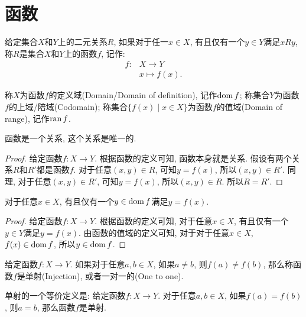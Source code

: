 \section{函数}
\begin{definition}[函数]
	给定集合$X$和$Y$上的二元关系$R$, 如果对于任一$x\in X$, 有且仅有一个$y\in Y$满足$xRy$, 称$R$是集合$X$和$Y$上的函数$f$, 记作:
	\begin{align*}
		f\colon & X\rightarrow Y \\
		& x\mapsto f(x).
	\end{align*}
	
	称$X$为函数$f$的定义域(Domain/Domain of definition), 记作$\operatorname{dom} f$; 称集合$Y$为函数$f$的上域/陪域(Codomain); 称集合$\{f(x)\mid x\in X\}$为函数$f$的值域(Domain of range), 记作$\operatorname{ran} f$.
\end{definition}

\begin{proposition}
	函数是一个关系, 这个关系是唯一的.
\end{proposition}

\begin{proof}
	给定函数$f\colon X\rightarrow Y$. 根据函数的定义可知, 函数本身就是关系. 假设有两个关系$R$和$R'$都是函数$f$. 对于任意$(x,y)\in R$, 可知$y=f(x)$, 所以$(x,y)\in R'$. 同理, 对于任意$(x,y)\in R'$, 可知$y=f(x)$, 所以$(x,y)\in R$. 所以$R=R'$.
\end{proof}

\begin{corollary}
	对于任意$x\in X$, 有且仅有一个$y\in \operatorname{dom} f$满足$y=f(x)$.
\end{corollary}

\begin{proof}
	给定函数$f\colon X\rightarrow Y$. 根据函数的定义可知, 对于任意$x\in X$, 有且仅有一个$y\in Y$满足$y=f(x)$. 由函数的值域的定义可知, 对于对于任意$x\in X$, $f(x)\in \operatorname{dom} f$, 所以$y\in \operatorname{dom} f$.
\end{proof}

\begin{definition}[单射]
	给定函数$f\colon X\rightarrow Y$. 如果对于任意$a,b\in X$, 如果$a\neq b$, 则$f(a)\neq f(b)$, 那么称函数$f$是单射(Injection), 或者一对一的(One to one).
\end{definition}

\begin{corollary}
	单射的一个等价定义是: 给定函数$f\colon X\rightarrow Y$. 对于任意$a,b \in X$, 如果$f(a)=f(b)$, 则$a=b$, 那么函数$f$是单射.
\end{corollary}


